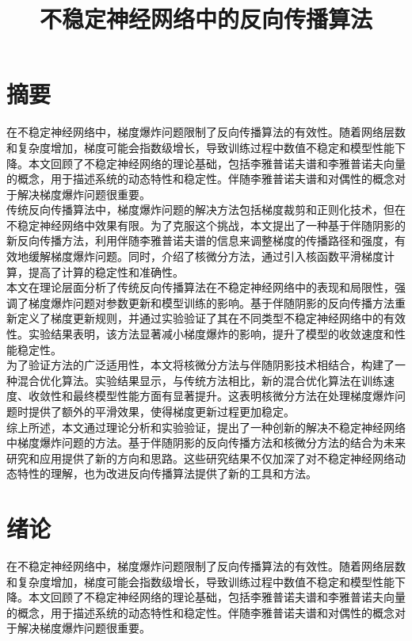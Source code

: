 \documentclass[12pt,a4paper]{amsart}
\title{不稳定神经网络中的反向传播算法}
\begin{document}
\maketitle

\section{摘要}

在不稳定神经网络中，梯度爆炸问题限制了反向传播算法的有效性。随着网络层数和复杂度增加，梯度可能会指数级增长，导致训练过程中数值不稳定和模型性能下降。本文回顾了不稳定神经网络的理论基础，包括李雅普诺夫谱和李雅普诺夫向量的概念，用于描述系统的动态特性和稳定性。伴随李雅普诺夫谱和对偶性的概念对于解决梯度爆炸问题很重要。\\

传统反向传播算法中，梯度爆炸问题的解决方法包括梯度裁剪和正则化技术，但在不稳定神经网络中效果有限。为了克服这个挑战，本文提出了一种基于伴随阴影的新反向传播方法，利用伴随李雅普诺夫谱的信息来调整梯度的传播路径和强度，有效地缓解梯度爆炸问题。同时，介绍了核微分方法，通过引入核函数平滑梯度计算，提高了计算的稳定性和准确性。\\

本文在理论层面分析了传统反向传播算法在不稳定神经网络中的表现和局限性，强调了梯度爆炸问题对参数更新和模型训练的影响。基于伴随阴影的反向传播方法重新定义了梯度更新规则，并通过实验验证了其在不同类型不稳定神经网络中的有效性。实验结果表明，该方法显著减小梯度爆炸的影响，提升了模型的收敛速度和性能稳定性。\\

为了验证方法的广泛适用性，本文将核微分方法与伴随阴影技术相结合，构建了一种混合优化算法。实验结果显示，与传统方法相比，新的混合优化算法在训练速度、收敛性和最终模型性能方面有显著提升。这表明核微分方法在处理梯度爆炸问题时提供了额外的平滑效果，使得梯度更新过程更加稳定。\\

综上所述，本文通过理论分析和实验验证，提出了一种创新的解决不稳定神经网络中梯度爆炸问题的方法。基于伴随阴影的反向传播方法和核微分方法的结合为未来研究和应用提供了新的方向和思路。这些研究结果不仅加深了对不稳定神经网络动态特性的理解，也为改进反向传播算法提供了新的工具和方法。\\

\section{绪论}

在不稳定神经网络中，梯度爆炸问题限制了反向传播算法的有效性。随着网络层数和复杂度增加，梯度可能会指数级增长，导致训练过程中数值不稳定和模型性能下降。本文回顾了不稳定神经网络的理论基础，包括李雅普诺夫谱和李雅普诺夫向量的概念，用于描述系统的动态特性和稳定性。伴随李雅普诺夫谱和对偶性的概念对于解决梯度爆炸问题很重要。\\
\end{document}
